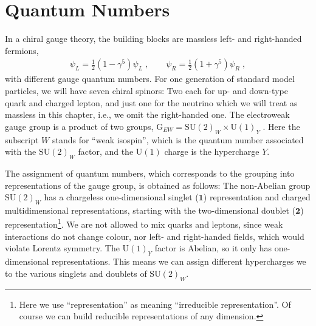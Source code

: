 \documentclass[12pt]{report}
\newcommand{\2}{\ensuremath{\sqrt{2}\,}}
\begin{document}
{         
    \section{Quantum Numbers}
      In a chiral gauge theory, the building blocks are massless left- and right-handed
      fermions, 
      \begin{align}
        \psi_L=\frac{1}{2}\left(1-\gamma^5\right) \psi_L\; , \qquad  
           \psi_R=\frac{1}{2}\left(1+\gamma^5\right) \psi_R \; ,
      \end{align}
      with different gauge quantum numbers. For one generation of standard model
      particles, we will have seven chiral spinors: Two each for up- and down-type quark and charged
      lepton, and just one for the neutrino which we will treat as massless in this chapter, i.e.,
      we omit the right-handed one. The electroweak gauge group is a product of two groups,
      $\mathrm{G}_{EW}=\mathrm{SU(2)}_W \times \mathrm{U(1)}_Y$
      . Here the subscript $W$ stands for 
      ``weak isospin'', which is the quantum number associated with the $\mathrm{SU(2)}_W$ factor, and
      the $\mathrm{U(1)}$ charge is the hypercharge $Y$.  
      
      The assignment of quantum numbers, which corresponds to the grouping into representations of 
      the gauge group, is obtained as follows: The non-Abelian group $\mathrm{SU(2)}_W$ has a chargeless 
      one-dimensional singlet ($\mathbf{1}$) representation and charged multidimensional representations,
      starting with the two-dimensional doublet ($\mathbf{2}$) representation\footnote{Here we use
        ``representation'' as meaning ``irreducible representation''. Of course we can build
        reducible representations of any dimension.}. We are not allowed to mix
      quarks and leptons, since weak interactions do not change colour, nor
      left- and right-handed fields, which would violate Lorentz symmetry. 
      The $\mathrm{U(1)}_Y$ factor is Abelian, so it only has
      one-dimensional representations. This means we can assign different hypercharges we to the
      various singlets and doublets of $\mathrm{SU(2)}_W$.

}
\end{document}
